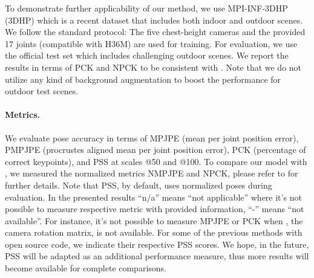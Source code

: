 \documentclass[10pt,twocolumn,letterpaper]{article}
\begin{document}
To demonstrate further applicability of our method, we use MPI-INF-3DHP (3DHP) \cite{monocular3d} which is a recent dataset that includes both indoor and outdoor scenes. We follow the standard protocol: The five chest-height cameras and the provided 17 joints (compatible with H36M) are used for training. For evaluation, we use the official test set which includes challenging outdoor scenes. We report the results in terms of PCK and NPCK to be consistent with \cite{rhodin2018}. Note that we do not utilize any kind of background augmentation to boost the performance for outdoor test scenes.

\begin{table}
\caption{\textbf{Triangulation results on H36M.} Effects of different 2D keypoint sources on triangulation performance. \textit{GT 2D} denotes the usage of ground truth 2D labels. \textit{H36M 2D} and \textit{MPII 2D} shows the pose estimation models trained on those datasets.}

\label{table:tri}


\end{table}
\paragraph{Metrics.}
We evaluate pose accuracy in terms of MPJPE (mean per joint position error), PMPJPE (procrustes aligned mean per joint position error), PCK (percentage of correct keypoints), and PSS at scales @50 and @100. To compare our model with \cite{rhodin2018}, we measured the normalized metrics NMPJPE and NPCK, please refer to \cite{rhodin2018} for further details. Note that PSS, by default, uses normalized poses during evaluation. In the presented results “n/a” means “not applicable” where it’s not possible to measure respective metric with provided information, “-” means “not available”. For instance, it’s not possible to measure MPJPE or PCK when , the camera rotation matrix, is not available. For some of the previous methods with open source code, we indicate their respective PSS scores. We hope, in the future, PSS will be adapted as an additional performance measure, thus more results will become available for complete comparisons. 
\end{document}
